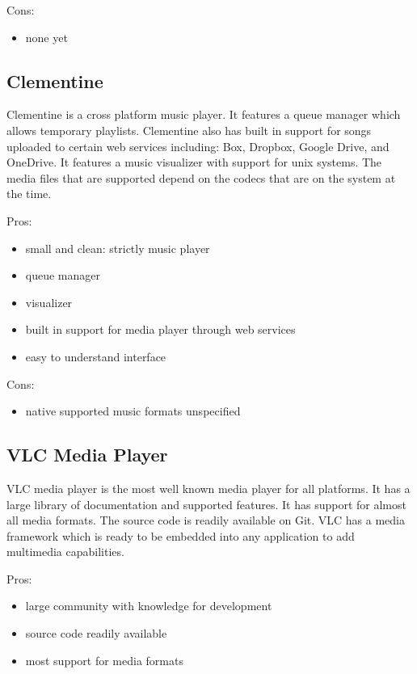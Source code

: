 \documentclass[onecolumn, draftclsnofoot,10pt, compsoc]{IEEEtran}
\begin{document}
Cons:
\begin{itemize}
    \item none yet
\end{itemize}

\subsection{Clementine}
Clementine is a cross platform music player. It features a queue manager which allows temporary playlists. Clementine also has built in support for songs uploaded to certain web services including: Box, Dropbox, Google Drive, and OneDrive. It features a music visualizer with support for unix systems. The media files that are supported depend on the codecs that are on the system at the time. 

Pros:
\begin{itemize}
    \item small and clean: strictly music player
    \item queue manager
    \item visualizer
    \item built in support for media player through web services
    \item easy to understand interface
\end{itemize}

Cons:
\begin{itemize}
    \item native supported music formats unspecified
\end{itemize}

\subsection{VLC Media Player}
VLC media player is the most well known media player for all platforms. It has a
large library of documentation and supported features. It has support for almost
all media formats. The source code is readily available on Git. VLC has a media
framework which is ready to be embedded into any application to add multimedia
capabilities.  

Pros:
\begin{itemize}
    \item large community with knowledge for development
    \item source code readily available
    \item most support for media formats
\end{itemize}
\end{document}
